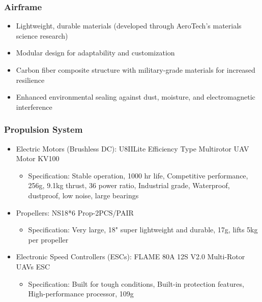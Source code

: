 \subsubsection{Airframe}
\begin{itemize}
    \item Lightweight, durable materials (developed through AeroTech's materials science research)
    \item Modular design for adaptability and customization
    \item Carbon fiber composite structure with military-grade materials for increased resilience
    \item Enhanced environmental sealing against dust, moisture, and electromagnetic interference
\end{itemize}

\subsubsection{Propulsion System}
\begin{itemize}
    \item Electric Motors (Brushless DC): U8IILite Efficiency Type Multirotor UAV Motor KV100
    \begin{itemize}
        \item Specification: Stable operation, 1000 hr life, Competitive performance, 256g, 9.1kg thrust, 36 power ratio, Industrial grade, Waterproof, dustproof, low noise, large bearings
    \end{itemize}
    \item Propellers: NS18*6 Prop-2PCS/PAIR
    \begin{itemize}
        \item Specification: Very large, 18" super lightweight and durable, 17g, lifts 5kg per propeller
    \end{itemize}
    \item Electronic Speed Controllers (ESCs): FLAME 80A 12S V2.0 Multi-Rotor UAVs ESC
    \begin{itemize}
        \item Specification: Built for tough conditions, Built-in protection features, High-performance processor, 109g
    \end{itemize}
\end{itemize}

